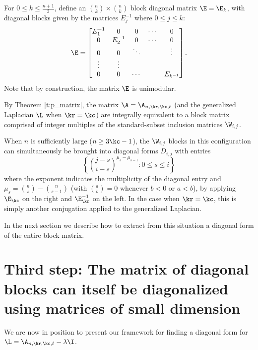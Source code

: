 \begin{definition}
For $0 \leq k \leq \frac{n+1}{3}$, define an $\binom{n}{k} \times \binom{n}{k}$ block diagonal matrix $\E=\E_{k}$, with diagonal blocks given by the matrices $E_{j}^{-1}$ where $0 \leq j \leq k$:
    \[
    \E = \begin{bmatrix}
        E_{1}^{-1} & 0 & 0 & \cdots &0 \\
        0 & E_{2}^{-1} &  0 & \cdots &0\\
        0 & 0 & \ddots & & \vdots \\
        \vdots & \vdots & & &\\
        0 & 0 & \cdots & & E_{k^{-1}}
    \end{bmatrix}.
    \]
Note that by construction, the matrix $\E$ is unimodular.
\end{definition}

By Theorem \ref{t:p_matrix}, the matrix $\A = \A_{n, \kr, \kc, \ell}$ (and the generalized Laplacian $\L$ when $\kr=\kc$) are integrally equivalent to a block matrix comprised of integer multiples of the standard-subset inclusion matrices $\W_{i,j}$.

\begin{corollary}\label{c:w_diagonal}
When $n$ is sufficiently large (\eg $n \geq 3\kc - 1$), the $\W_{i,j}$ blocks in this configuration can simultaneously be brought into diagonal forms $D_{i,j}$ with entries 
\[ \left\{ \binom{j-s}{i-s}^{\mu_s - \mu_{s-1}} : 0 \leq s \leq i \right\} \]
where the exponent indicates the multiplicity of the diagonal entry and $\mu_s = \binom{n}{s} - \binom{n}{s-1}$ (with $\binom{a}{b} = 0$ whenever $b<0$ or $a<b$), by applying $\E_{\kc}$ on the right and $\E_{\kr}^{-1}$ on the left.  In the case when $\kr=\kc$, this is simply another conjugation applied to the generalized Laplacian.
\end{corollary}

In the next section we describe how to extract from this situation a diagonal form of the entire block matrix.



\section{Third step:  The matrix of diagonal blocks can itself be diagonalized using matrices of small dimension}\label{s:diagonalize}

We are now in position to present our framework for finding a diagonal form for $\L = \A_{n,\kr,\kc,\ell} - \lambda \I$.  


